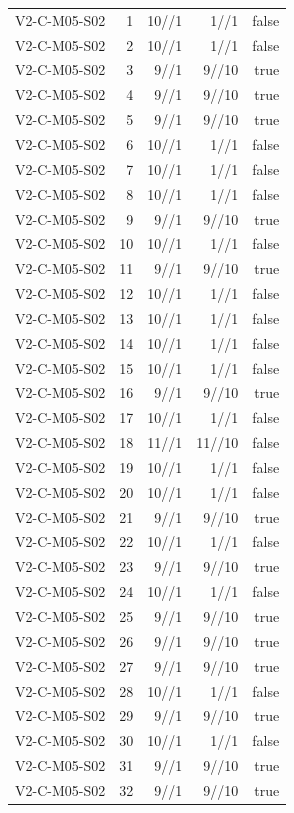 {\begin{longtable}{lrrrr}
V2-C-M05-S02 & 1 & 10//1 & 1//1 & false \\
V2-C-M05-S02 & 2 & 10//1 & 1//1 & false \\
V2-C-M05-S02 & 3 & 9//1 & 9//10 & true \\
V2-C-M05-S02 & 4 & 9//1 & 9//10 & true \\
V2-C-M05-S02 & 5 & 9//1 & 9//10 & true \\
V2-C-M05-S02 & 6 & 10//1 & 1//1 & false \\
V2-C-M05-S02 & 7 & 10//1 & 1//1 & false \\
V2-C-M05-S02 & 8 & 10//1 & 1//1 & false \\
V2-C-M05-S02 & 9 & 9//1 & 9//10 & true \\
V2-C-M05-S02 & 10 & 10//1 & 1//1 & false \\
V2-C-M05-S02 & 11 & 9//1 & 9//10 & true \\
V2-C-M05-S02 & 12 & 10//1 & 1//1 & false \\
V2-C-M05-S02 & 13 & 10//1 & 1//1 & false \\
V2-C-M05-S02 & 14 & 10//1 & 1//1 & false \\
V2-C-M05-S02 & 15 & 10//1 & 1//1 & false \\
V2-C-M05-S02 & 16 & 9//1 & 9//10 & true \\
V2-C-M05-S02 & 17 & 10//1 & 1//1 & false \\
V2-C-M05-S02 & 18 & 11//1 & 11//10 & false \\
V2-C-M05-S02 & 19 & 10//1 & 1//1 & false \\
V2-C-M05-S02 & 20 & 10//1 & 1//1 & false \\
V2-C-M05-S02 & 21 & 9//1 & 9//10 & true \\
V2-C-M05-S02 & 22 & 10//1 & 1//1 & false \\
V2-C-M05-S02 & 23 & 9//1 & 9//10 & true \\
V2-C-M05-S02 & 24 & 10//1 & 1//1 & false \\
V2-C-M05-S02 & 25 & 9//1 & 9//10 & true \\
V2-C-M05-S02 & 26 & 9//1 & 9//10 & true \\
V2-C-M05-S02 & 27 & 9//1 & 9//10 & true \\
V2-C-M05-S02 & 28 & 10//1 & 1//1 & false \\
V2-C-M05-S02 & 29 & 9//1 & 9//10 & true \\
V2-C-M05-S02 & 30 & 10//1 & 1//1 & false \\
V2-C-M05-S02 & 31 & 9//1 & 9//10 & true \\
V2-C-M05-S02 & 32 & 9//1 & 9//10 & true \\

\end{longtable}}
